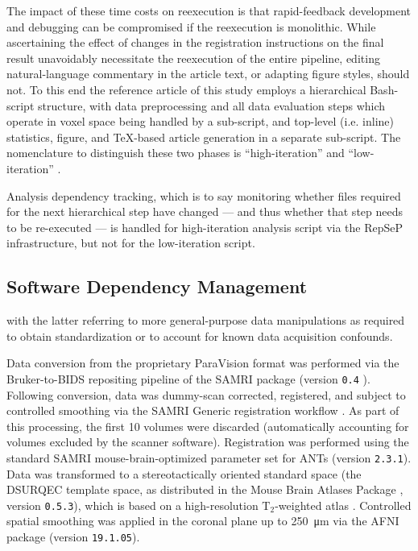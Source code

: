 The impact of these time costs on reexecution is that rapid-feedback development and debugging can be compromised if the reexecution is monolithic.
While ascertaining the effect of changes in the registration instructions on the final result unavoidably necessitate the reexecution of the entire pipeline, editing natural-language commentary in the article text, or adapting figure styles, should not.
To this end the reference article of this study employs a hierarchical Bash-script structure, with data preprocessing and all data evaluation steps which operate in voxel space being handled by a sub-script, and top-level (i.e. inline) statistics, figure, and TeX-based article generation in a separate sub-script.
The nomenclature to distinguish these two phases is “high-iteration” and “low-iteration” \cite{repsep}.

Analysis dependency tracking, which is to say monitoring whether files required for the next hierarchical step have changed — and thus whether that step needs to be re-executed — is handled for high-iteration analysis script via the RepSeP infrastructure, but not for the low-iteration script.


\subsection{Software Dependency Management}


with the latter referring to more general-purpose data manipulations as required to obtain standardization or to account for known data acquisition confounds.



Data conversion from the proprietary ParaVision format was performed via the Bruker-to-BIDS repositing pipeline \supercite{aowsis} of the SAMRI package (version \textcolor{mg}{\texttt{0.4}} \supercite{samri}).
Following conversion, data was dummy-scan corrected, registered, and subject to controlled smoothing via the SAMRI Generic registration workflow \supercite{irsabi}.
As part of this processing, the first 10 volumes were discarded (automatically accounting for volumes excluded by the scanner software).
Registration was performed using the standard SAMRI mouse-brain-optimized parameter set for ANTs \supercite{ants} (version \textcolor{mg}{\texttt{2.3.1}}).
Data was transformed to a stereotactically oriented standard space (the DSURQEC template space, as distributed in the Mouse Brain Atlases Package \supercite{atlases_generator}, version \textcolor{mg}{\texttt{0.5.3}}), which is based on a high-resolution $\mathrm{T_2}$-weighted atlas \supercite{dsu1}.
Controlled spatial smoothing was applied in the coronal plane up to \SI{250}{\micro\meter} via the AFNI package \supercite{afni} (version \textcolor{mg}{\texttt{19.1.05}}).

